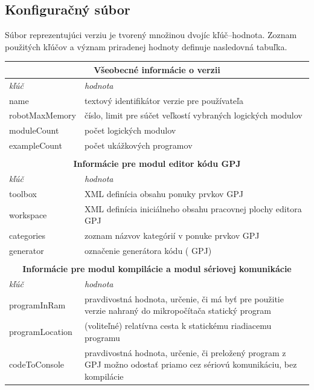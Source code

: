\subsection{Konfiguračný súbor}
\label{sub:konfig-subor-verzie}
Súbor reprezentujúci verziu je tvorený množinou dvojíc kľúč--hodnota. Zoznam použitých kľúčov a význam priradenej hodnoty definuje nasledovná tabuľka.

\begin{table}\footnotesize
\centering
\begin{tabular}{ |p{3.8cm}|p{10cm}|  }
 \hline
	\multicolumn{2}{|c|}{\textbf{Všeobecné informácie o verzii}} \\
 \hline
	\textit{kľúč} & \textit{hodnota}\\
 \hline
	name&textový identifikátor verzie pre používateľa\\
	robotMaxMemory&číslo, limit pre súčet veľkostí vybraných logických modulov\\
	moduleCount&počet logických modulov\\
	exampleCount&počet ukážkových programov\\
 \hline

 \multicolumn{2}{c}{} \\
 \multicolumn{2}{c}{\textbf{Informácie pre modul editor kódu GPJ}} \\
 \hline
	\textit{kľúč} & \textit{hodnota}\\
 \hline
 	toolbox&XML definícia obsahu ponuky prvkov GPJ\\
 	workspace&XML definícia iniciálneho obsahu pracovnej plochy editora GPJ\\
 	categories&zoznam názvov kategórií v ponuke prvkov GPJ\\
 	generator&označenie generátora kódu (\uv{prekladača} GPJ)\\
 \hline

 \multicolumn{2}{c}{} \\
 \multicolumn{2}{c}{\textbf{Informácie pre modul kompilácie a modul sériovej komunikácie}} \\
 \hline
	\textit{kľúč} & \textit{hodnota}\\
 \hline
	programInRam&pravdivostná hodnota, určenie, či má byť pre použitie verzie nahraný do mikropočítača statický program\\
	programLocation&(voliteľné) relatívna cesta k statickému riadiacemu programu\\
	codeToConsole&pravdivostná hodnota, určenie, či preložený program z GPJ možno odostať priamo cez sériovú komunikáciu, bez kompilácie\\
 \hline


\end{tabular}
\end{table}
